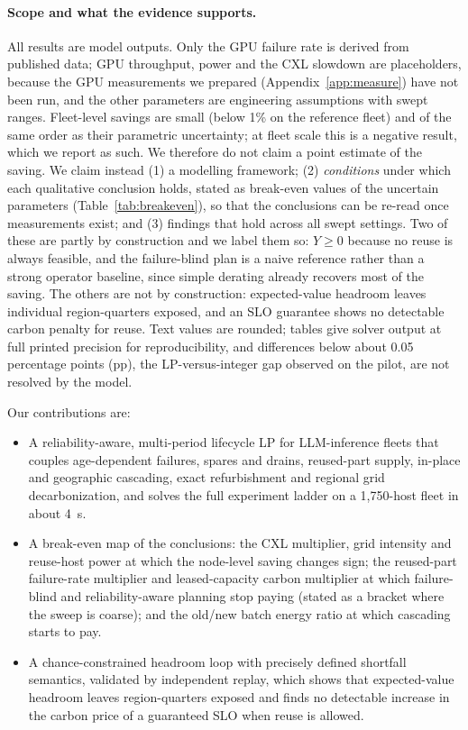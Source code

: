 \documentclass{article} %
\begin{document}
\paragraph{Scope and what the evidence supports.} All results are model outputs. Only the GPU failure rate is derived from published data; GPU throughput, power and the CXL slowdown are placeholders, because the GPU measurements we prepared (Appendix~\ref{app:measure}) have not been run, and the other parameters are engineering assumptions with swept ranges. Fleet-level savings are small (below 1\% on the reference fleet) and of the same order as their parametric uncertainty; at fleet scale this is a negative result, which we report as such. We therefore do not claim a point estimate of the saving. We claim instead (1) a modelling framework; (2) \emph{conditions} under which each qualitative conclusion holds, stated as break-even values of the uncertain parameters (Table~\ref{tab:breakeven}), so that the conclusions can be re-read once measurements exist; and (3) findings that hold across all swept settings. Two of these are partly by construction and we label them so: $Y\ge 0$ because no reuse is always feasible, and the failure-blind plan is a naive reference rather than a strong operator baseline, since simple derating already recovers most of the saving. The others are not by construction: expected-value headroom leaves individual region-quarters exposed, and an SLO guarantee shows no detectable carbon penalty for reuse. Text values are rounded; tables give solver output at full printed precision for reproducibility, and differences below about 0.05 percentage points (pp), the LP-versus-integer gap observed on the pilot, are not resolved by the model.

Our contributions are:
\begin{itemize}
    \item A reliability-aware, multi-period lifecycle LP for LLM-inference fleets that couples age-dependent failures, spares and drains, reused-part supply, in-place and geographic cascading, exact refurbishment and regional grid decarbonization, and solves the full experiment ladder on a 1,750-host fleet in about 4~s.
    \item A break-even map of the conclusions: the CXL multiplier, grid intensity and reuse-host power at which the node-level saving changes sign; the reused-part failure-rate multiplier and leased-capacity carbon multiplier at which failure-blind and reliability-aware planning stop paying (stated as a bracket where the sweep is coarse); and the old/new batch energy ratio at which cascading starts to pay.
    \item A chance-constrained headroom loop with precisely defined shortfall semantics, validated by independent replay, which shows that expected-value headroom leaves region-quarters exposed and finds no detectable increase in the carbon price of a guaranteed SLO when reuse is allowed.
\end{itemize}
\end{document}
